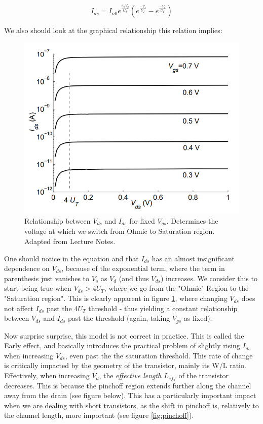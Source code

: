 \begin{equation}
I_{ds} = I_{n0} e^{\frac{\kappa_{n}V_g}{U_T}}(e^\frac{-V_s}{U_T} - e^\frac{-V_d}{U_T})
\end{equation}

We also should look at the graphical relationship this relation implies:

\begin{figure}[H]
    \centering
    \includegraphics[width=0.7\linewidth]{../../Figures/Vds_Vs_Ids_No_Early_Effect.PNG}
    \caption{Relationship between $V_{ds}$ and $I_{ds}$ for fixed $V_{gs}$. Determines the voltage at which we switch from Ohmic to Saturation region. Adapted from Lecture Notes.}
    \label{fig:vdsids}
\end{figure}

One should notice in the equation and that $I_{ds}$ has an almost insignificant dependence on $V_{ds}$, because of the exponential term, where the term in parenthesis just vanishes to $V_{s}$ as $V_{d}$ (and thus $V_{ds}$) increases. We consider this to start being true when $V_{ds} > 4U_T$, where we go from the "Ohmic" Region to the "Saturation region". This is clearly apparent in figure \ref{fig:vdsids}, where changing $V_{ds}$ does not affect $I_{ds}$ past the 4$U_T$ threshold - thus yielding a constant relationship between $V_{ds}$ and $I_{ds}$ past the threshold (again, taking $V_{gs}$ as fixed). 

Now surprise surprise, this model is not correct in practice. This is called the Early effect, and basically introduces the practical problem of slightly rising $I_{ds}$ when increasing $V_{ds}$, even past the the saturation threshold. This rate of change is critically impacted by the geometry of the transistor, mainly its W/L ratio. Effectively, when increasing $V_d$, the \emph{effective length $L_{eff}$} of the transistor decreases. This is because the pinchoff region extends further along the channel away from the drain (see figure below). This has a particularly important impact when we are dealing with short transistors, as the shift in pinchoff is, relatively to the channel length, more important (see figure \ref{fig:pinchoff}). 

